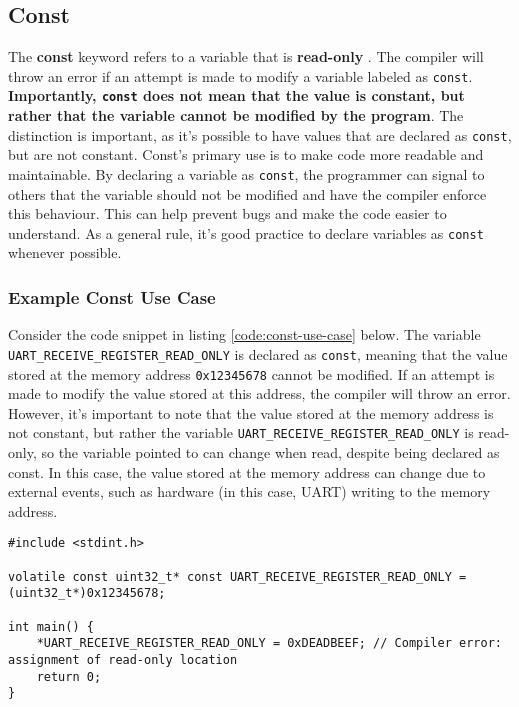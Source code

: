 \documentclass[main.tex]{subfiles}
\begin{document}
\subsection{Const}
The \textbf{const} keyword refers to a variable that is \textbf{read-only} \cite{beningoConst}. The compiler will throw an error if an attempt is made to modify a variable labeled as \texttt{const}. \textbf{Importantly, \texttt{const} does not mean that the value is constant, but rather that the variable cannot be modified by the program}. The distinction is important, as it's possible to have values that are declared as \texttt{const}, but are not constant. 
\newline
\newline
\noindent Const's primary use is to make code more readable and maintainable. By declaring a variable as \texttt{const}, the programmer can signal to others that the variable should not be modified and have the compiler enforce this behaviour. This can help prevent bugs and make the code easier to understand. As a general rule, it's good practice to declare variables as \texttt{const} whenever possible.

\subsubsection{Example Const Use Case}
Consider the code snippet in listing \ref{code:const-use-case} below. The variable \texttt{UART\_RECEIVE\_REGISTER\_READ\_ONLY} is declared as \texttt{const}, meaning that the value stored at the memory address \texttt{0x12345678} cannot be modified. If an attempt is made to modify the value stored at this address, the compiler will throw an error. However, it's important to note that the value stored at the memory address is not constant, but rather the variable \texttt{UART\_RECEIVE\_REGISTER\_READ\_ONLY} is read-only, so the variable pointed to can change when read, despite being declared as const. In this case, the value stored at the memory address can change due to external events, such as hardware (in this case, UART) writing to the memory address.

\begin{lstlisting}[caption={Example use case of Const}, label={code:const-use-case}]
#include <stdint.h>

volatile const uint32_t* const UART_RECEIVE_REGISTER_READ_ONLY = (uint32_t*)0x12345678;

int main() {
    *UART_RECEIVE_REGISTER_READ_ONLY = 0xDEADBEEF; // Compiler error: assignment of read-only location
    return 0;
}
\end{lstlisting}
\end{document}
